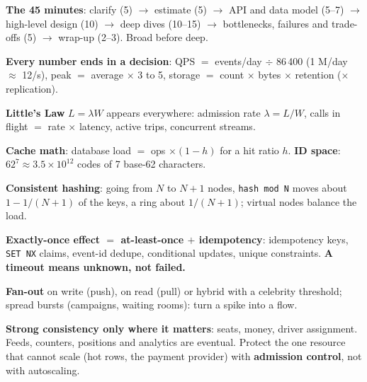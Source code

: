 \stages{\stClarify\ \stEstimate\ \stDesign\ \stDeep}

\begin{know}
  \item \textbf{The 45 minutes}: clarify (5) $\to$ estimate (5) $\to$ API and data model (5--7) $\to$ high-level design (10) $\to$ deep dives (10--15) $\to$ bottlenecks, failures and trade-offs (5) $\to$ wrap-up (2--3). Broad before deep.
  \item \textbf{Every number ends in a decision}: QPS $=$ events/day $\div$ 86\,400 (1 M/day $\approx$ 12/s), peak $=$ average $\times$ 3 to 5, storage $=$ count $\times$ bytes $\times$ retention ($\times$ replication).
  \item \textbf{Little's Law} $L = \lambda W$ appears everywhere: admission rate $\lambda = L/W$, calls in flight $=$ rate $\times$ latency, active trips, concurrent streams.
  \item \textbf{Cache math}: database load $=$ ops $\times (1-h)$ for a hit ratio $h$. \textbf{ID space}: $62^7 \approx 3.5 \times 10^{12}$ codes of 7 base-62 characters.
  \item \textbf{Consistent hashing}: going from $N$ to $N+1$ nodes, \texttt{hash mod N} moves about $1 - 1/(N+1)$ of the keys, a ring about $1/(N+1)$; virtual nodes balance the load.
  \item \textbf{Exactly-once effect $=$ at-least-once $+$ idempotency}: idempotency keys, \texttt{SET NX} claims, event-id dedupe, conditional updates, unique constraints. \textbf{A timeout means unknown, not failed.}
  \item \textbf{Fan-out} on write (push), on read (pull) or hybrid with a celebrity threshold; spread bursts (campaigns, waiting rooms): turn a spike into a flow.
  \item \textbf{Strong consistency only where it matters}: seats, money, driver assignment. Feeds, counters, positions and analytics are eventual. Protect the one resource that cannot scale (hot rows, the payment provider) with \textbf{admission control}, not with autoscaling.
\end{know}

